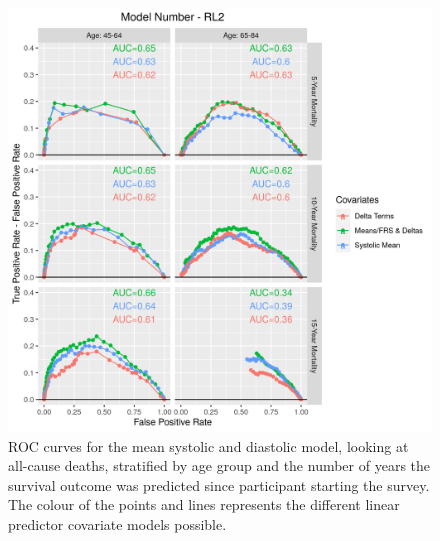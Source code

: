 \documentclass[
]{article}
\begin{document}
\begin{figure}
\centering
\includegraphics{./Rmarkdown_Plots/ROC_CAx-Covariates_EventType_RL2.png}
\caption{ROC curves for the mean systolic and diastolic model, looking at all-cause deaths, stratified by age group and the number of years the survival outcome was predicted since participant starting the survey. The colour of the points and lines represents the different linear predictor covariate models possible.}\label{fig:ROC_RL2}
\end{figure}
\end{document}
